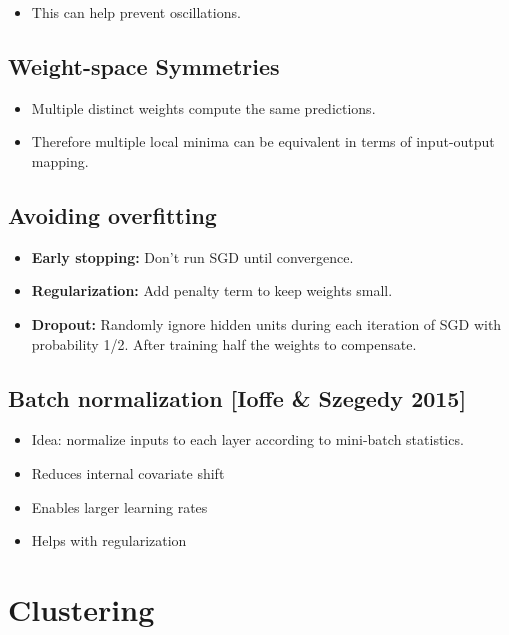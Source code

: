 \documentclass[10pt,a4paper]{scrartcl}
\begin{document}
\begin{multicols*}{2}
\begin{itemize}
\begin{TDefinitionTable*}
$a$&Previous direction\\
$m$&Friction (\glqq forgetting\grqq previous $a$
\end{TDefinitionTable*}
\item This can help prevent oscillations.
\end{itemize}

\subsection{Weight-space Symmetries}

\begin{itemize}
\item Multiple distinct weights compute the same predictions.
\item Therefore multiple local minima can be equivalent in terms of input-output mapping.
\end{itemize}

\subsection{Avoiding overfitting}

\begin{itemize}
\item \textbf{Early stopping:} Don't run SGD until convergence.
\item \textbf{Regularization:} Add penalty term to keep weights small.
\item \textbf{Dropout:} Randomly ignore hidden units during each iteration of SGD with probability 1/2. After training half the weights to compensate.
\end{itemize}

\subsection{Batch normalization [Ioffe \& Szegedy 2015]}

\begin{itemize}
\item Idea: normalize inputs to each layer according to mini-batch statistics.
\item Reduces internal covariate shift
\item Enables larger learning rates
\item Helps with regularization
\end{itemize}

\section{Clustering}


\end{multicols*}
\end{document}

